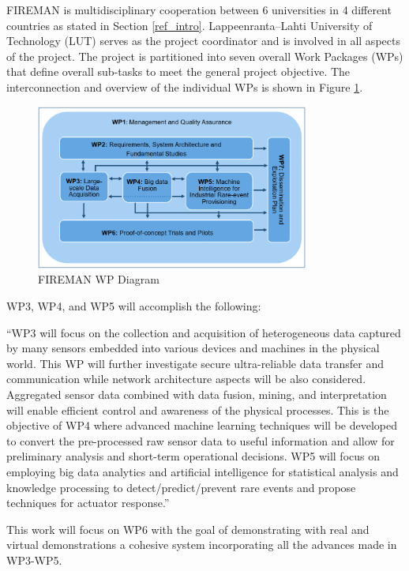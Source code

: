FIREMAN is multidisciplinary cooperation between 6 universities in 4 different countries as stated in Section \ref{ref_intro}. Lappeenranta--Lahti University of Technology (LUT) serves as the project coordinator and is involved in all aspects of the project. The project is partitioned into seven overall Work Packages (WPs) that define overall sub-tasks to meet the general project objective. The interconnection and overview of the individual WPs is shown in Figure \ref{fig:wp-diagram}.

\begin{figure}[H]
    \includegraphics[width=0.8\textwidth]{Images/FIREMAN_pert_diagram.png}
    \caption{FIREMAN WP Diagram}
    \label{fig:wp-diagram}
\end{figure}

WP3, WP4, and WP5 will accomplish the following:
\begin{displayquote}
\enquote{WP3 will focus on the collection and acquisition of heterogeneous data captured by many sensors embedded into various devices and machines in the physical world. This WP will further investigate secure ultra-reliable data transfer and communication while network architecture aspects will be also considered. Aggregated sensor data combined with data fusion, mining, and interpretation will enable efficient control and awareness of the physical processes. This is the objective of WP4 where advanced machine learning techniques will be developed to convert the pre-processed raw sensor data to useful information and allow for preliminary analysis and short-term operational decisions. WP5 will focus on employing big data analytics and artificial intelligence for statistical analysis and knowledge processing to detect/predict/prevent rare events and propose techniques for actuator response.}
\end{displayquote}

This work will focus on WP6 with the goal of demonstrating with real and virtual demonstrations a cohesive system incorporating all the advances made in WP3-WP5.  

